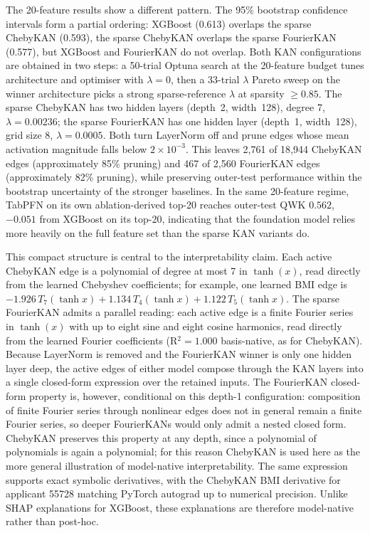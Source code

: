 \documentclass{article}
\begin{document}
The 20-feature results show a different pattern. The 95\% bootstrap confidence intervals form a partial ordering: XGBoost (0.613) overlaps the sparse ChebyKAN (0.593), the sparse ChebyKAN overlaps the sparse FourierKAN (0.577), but XGBoost and FourierKAN do not overlap. Both KAN configurations are obtained in two steps: a 50-trial Optuna search at the 20-feature budget tunes architecture and optimiser with $\lambda=0$, then a 33-trial $\lambda$ Pareto sweep on the winner architecture picks a strong sparse-reference $\lambda$ at sparsity $\geq 0.85$. The sparse ChebyKAN has two hidden layers (depth~2, width~128), degree 7, $\lambda=0.00236$; the sparse FourierKAN has one hidden layer (depth~1, width~128), grid size 8, $\lambda=0.0005$. Both turn LayerNorm off and prune edges whose mean activation magnitude falls below $2\times10^{-3}$. This leaves 2{,}761 of 18{,}944 ChebyKAN edges (approximately 85\% pruning) and 467 of 2{,}560 FourierKAN edges (approximately 82\% pruning), while preserving outer-test performance within the bootstrap uncertainty of the stronger baselines. In the same 20-feature regime, TabPFN on its own ablation-derived top-20 reaches outer-test QWK $0.562$, $-0.051$ from XGBoost on its top-20, indicating that the foundation model relies more heavily on the full feature set than the sparse KAN variants do.

This compact structure is central to the interpretability claim. Each active ChebyKAN edge is a polynomial of degree at most 7 in $\tanh(x)$, read directly from the learned Chebyshev coefficients; for example, one learned BMI edge is $-1.926\,T_7(\tanh x)+1.134\,T_4(\tanh x)+1.122\,T_5(\tanh x)$. The sparse FourierKAN admits a parallel reading: each active edge is a finite Fourier series in $\tanh(x)$ with up to eight sine and eight cosine harmonics, read directly from the learned Fourier coefficients (R$^2 = 1.000$ basis-native, as for ChebyKAN). Because LayerNorm is removed and the FourierKAN winner is only one hidden layer deep, the active edges of either model compose through the KAN layers into a single closed-form expression over the retained inputs. The FourierKAN closed-form property is, however, conditional on this depth-1 configuration: composition of finite Fourier series through nonlinear edges does not in general remain a finite Fourier series, so deeper FourierKANs would only admit a nested closed form. ChebyKAN preserves this property at any depth, since a polynomial of polynomials is again a polynomial; for this reason ChebyKAN is used here as the more general illustration of model-native interpretability. The same expression supports exact symbolic derivatives, with the ChebyKAN BMI derivative for applicant 55728 matching PyTorch autograd up to numerical precision. Unlike SHAP explanations for XGBoost, these explanations are therefore model-native rather than post-hoc.
\end{document}
